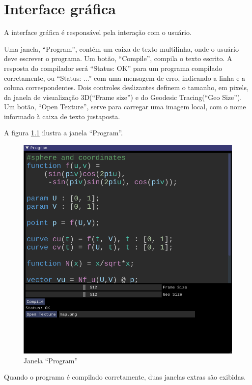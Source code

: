 \chapter{Interface gráfica}
\label{interface}

A interface gráfica é responsável pela interação com o usuário.

Uma janela, ``Program'', contém um caixa de texto multilinha, onde
o usuário deve escrever o programa.
Um botão, ``Compile'', compila o texto escrito.
A resposta do compilador será ``Status: OK'' para um programa compilado 
corretamente, ou ``Status: ...'' com uma mensagem de erro, indicando a
linha e a coluna correspondentes.
Dois controles deslizantes definem o tamanho, em pixels, da janela
de visualização 3D(``Frame size'') e do Geodesic Tracing(``Geo Size'').
Um botão, ``Open Texture'', serve para carregar uma imagem local,
com o nome informado à caixa de texto justaposta.

A figura \ref{img:program} ilustra a janela ``Program''.

\begin{figure}[!ht]
    \includegraphics[width=\linewidth]{program.png}
    \caption{Janela ``Program''}
    \label{img:program}
\end{figure}

Quando o programa é compilado corretamente, duas janelas extras são exibidas.

